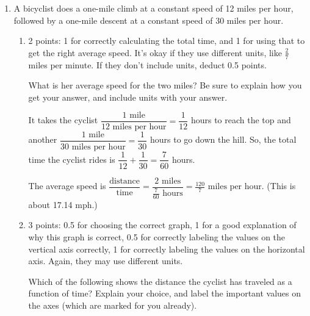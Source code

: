 \documentclass{article}
\begin{document}
\begin{enumerate}
\begin{enumerate}
  \end{enumerate}

\item \label{gottlieb-2.3.12-modified} %

  A bicyclist does a one-mile climb at a constant speed of 12 miles per hour, followed by a one-mile descent at a constant speed of 30 miles per hour.

  \begin{enumerate}
  \item \label{gottlieb-2.3.12b}

    \begin{grading}
      2 points: 1 for correctly calculating the total time, and 1 for using that to get the right average speed. It's okay if they use different units, like $\frac{2}{7}$ miles per minute. If they don't include units, deduct 0.5 points. 
    \end{grading}

    \begin{problem}[\vfill]
      What is her average speed for the two miles? Be sure to explain how you get your answer, and include units with your answer. 
    \end{problem}

    \begin{solution}
      It takes the cyclist $\dfrac{1 \text{ mile}}{12 \text{ miles per hour}} = \dfrac{1}{12}$ hours to reach the top and another $\dfrac{1 \text{ mile}}{30 \text{ miles per hour}} = \dfrac{1}{30}$ hours to go down the hill. So, the total time the cyclist rides is $\dfrac{1}{12} + \dfrac{1}{30} = \dfrac{7}{60}$ hours.

      The average speed is $\dfrac{\text{distance}}{\text{time}} = \dfrac{2 \text{ miles}}{\frac{7}{60} \text{ hours}} = \boxed{\frac{120}{7} \text{ miles per hour}}$. (This is about 17.14 mph.)
    \end{solution} 

  \item

    \begin{grading}
      3 points: 0.5 for choosing the correct graph, 1 for a good explanation of why this graph is correct, 0.5 for correctly labeling the values on the vertical axis correctly, 1 for correctly labeling the values on the horizontal axis. Again, they may use different units. 
    \end{grading}

    \begin{problem}[\stretch{0.5}]
      Which of the following shows the distance the cyclist has traveled as a function of time? Explain your choice, and label the important values on the axes (which are marked for you already).


\end{problem}
\end{enumerate}
\end{enumerate}
\end{document}
